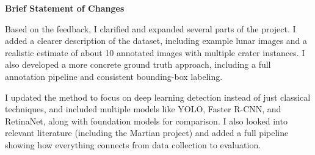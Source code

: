 \documentclass[conference]{IEEEtran}
\begin{document}
	
	
	
	\clearpage
	
	\textbf{Brief Statement of Changes}
	
	Based on the feedback, I clarified and expanded several parts of the project. I added a clearer description of the dataset, including example lunar images and a realistic estimate of about 10 annotated images with multiple crater instances. I also developed a more concrete ground truth approach, including a full annotation pipeline and consistent bounding-box labeling.
	
	I updated the method to focus on deep learning detection instead of just classical techniques, and included multiple models like YOLO, Faster R-CNN, and RetinaNet, along with foundation models for comparison. I also looked into relevant literature (including the Martian project) and added a full pipeline showing how everything connects from data collection to evaluation.
\end{document}
